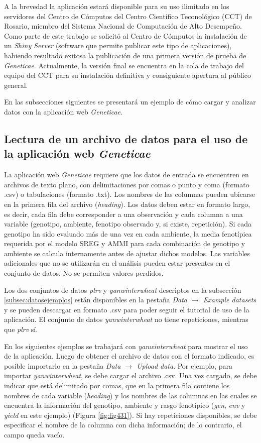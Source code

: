 A la brevedad la aplicación estará disponible para su uso ilimitado en los servidores del Centro de Cómputos del Centro Científico Teconológico (CCT) de Rosario, miembro del Sistema Nacional de Computación de Alto Desempeño. Como parte de este trabajo se solicitó al Centro de Cómputos la instalación de un \emph{Shiny Server}  (software que permite publicar este tipo de aplicaciones), habiendo resultado exitosa la publicación de una primera versión de prueba de \emph{Geneticae}. Actualmente, la versión final se encuentra en la cola de trabajo del equipo del CCT para su instalación definitiva y consiguiente apertura al público general.

En las subsecciones siguientes se presentará un ejemplo de cómo cargar y analizar datos con la aplicación web \emph{Geneticae}.

\subsection{Lectura de un archivo de datos para el uso de la aplicación web \emph{Geneticae}}

La aplicación web \emph{Geneticae} requiere que los datos de entrada se encuentren en archivos de texto plano, con delimitaciones por comas o punto y coma (formato .csv) o tabulaciones (formato .txt). Los nombres de las columnas pueden ubicarse en la primera fila del archivo (\emph{heading}). Los datos deben estar en formato largo, es decir, cada fila debe corresponder a una observación y cada columna a una variable (genotipo, ambiente, fenotipo observado y, si existe, repetición). Si cada genotipo ha sido evaluado más de una vez en cada ambiente, la media fenotípica requerida por el modelo SREG y AMMI para cada combinación de genotipo y ambiente se calcula internamente antes de ajustar dichos modelos. Las variables adicionales que no se utilizarán en el análisis pueden estar presentes en el conjunto de datos. No se permiten valores perdidos.

Los dos conjuntos de datos \emph{plrv} y \emph{yanwinterwheat} descriptos en la subsección \ref{subsec:datosejemplos} están disponibles en la pestaña \emph{Data $\rightarrow$ Example datasets} y se pueden descargar en formato .csv para poder seguir el tutorial de uso de la aplicación. El conjunto de datos \emph{yanwinterwheat} no tiene repeticiones, mientras que \emph{plrv} sí. 

En los siguientes ejemplos se trabajará con \emph{yanwinterwheat} para mostrar el uso de la aplicación. Luego de obtener el archivo de datos con el formato indicado, es posible importarlo en la pestaña \emph{Data $\rightarrow$ Upload data}. Por ejemplo, para importar \emph{yanwinterwheat}, se debe cargar el archivo .csv. Una vez cargado, se debe indicar que está delimitado por comas, que en la primera fila contiene los nombres de cada variable (\emph{heading}) y los nombres de las columnas en las cuales se encuentra la información del genotipo, ambiente y rasgo fenotípico (\emph{gen}, \emph{env} y \emph{yield} en este ejemplo) (Figura \ref{fig:fig431}). Si hay repeticiones disponibles, se debe especificar el nombre de la columna con dicha información; de lo contrario, el campo queda vacío. 

